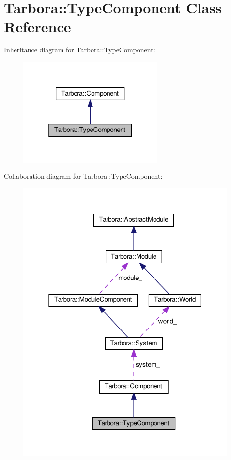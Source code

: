 \hypertarget{classTarbora_1_1TypeComponent}{}\section{Tarbora\+:\+:Type\+Component Class Reference}
\label{classTarbora_1_1TypeComponent}


Inheritance diagram for Tarbora\+:\+:Type\+Component\+:
\nopagebreak
\begin{figure}[H]
\begin{center}
\leavevmode
\includegraphics[width=208pt]{classTarbora_1_1TypeComponent__inherit__graph}
\end{center}
\end{figure}


Collaboration diagram for Tarbora\+:\+:Type\+Component\+:
\nopagebreak
\begin{figure}[H]
\begin{center}
\leavevmode
\includegraphics[width=316pt]{classTarbora_1_1TypeComponent__coll__graph}
\end{center}
\end{figure}

